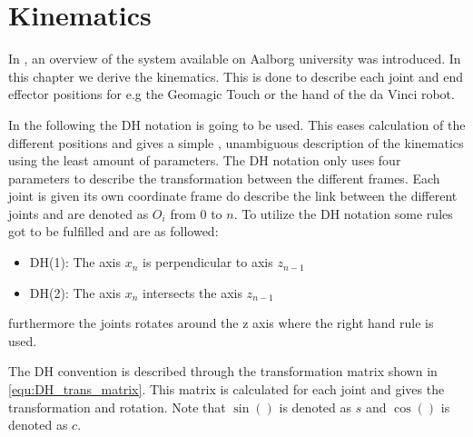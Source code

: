 \chapter{Kinematics}\label{cha:kinematic}

In , an overview of the system available on Aalborg university was introduced. In this chapter we derive the kinematics. This is done to describe each joint and end effector positions for e.g the Geomagic Touch or the hand of the da Vinci robot. 

In the following the \gls{DH} notation is going to be used\cite{spong2008robot}. This eases calculation of the different positions and gives a simple , unambiguous description of the kinematics using the least amount of parameters. The \gls{DH} notation only uses four parameters to describe the transformation between the different frames. Each joint is given its own coordinate frame do describe the link between the different joints and are denoted as $O_i$ from 0 to $n$. To utilize the \gls{DH} notation some rules got to be fulfilled and are as followed\cite{spong2008robot}:

\begin{itemize}
\item DH(1): The axis $x_n$ is perpendicular to axis $z_{n-1}$
\item DH(2): The axis $x_n$ intersects the axis $z_{n-1}$
\end{itemize}

furthermore the joints rotates around the z axis where the right hand rule is used.

The \gls{DH} convention is described through the transformation matrix shown in \eqref{equ:DH_trans_matrix}\cite{spong2008robot}. This matrix is calculated for each joint and gives the transformation and rotation. Note that $\sin()$ is denoted as $s$ and $\cos()$ is denoted as $c$.

